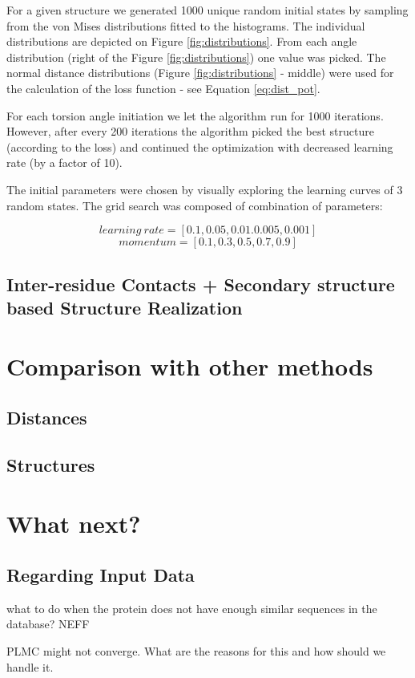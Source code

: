 For a given structure we generated 1000 unique random initial states by sampling from the von Mises distributions fitted to the histograms. The individual distributions are depicted on Figure \ref{fig:distributions}. From each angle distribution (right of the Figure \ref{fig:distributions}) one value was picked. The normal distance distributions (Figure \ref{fig:distributions} - middle) were used for the calculation of the loss function - see Equation \ref{eq:dist_pot}.

For each torsion angle initiation we let the algorithm run for 1000 iterations. However, after every 200 iterations the algorithm picked the best structure (according to the loss) and continued the optimization with decreased learning rate (by a factor of 10).

The initial parameters were chosen by visually exploring the learning curves of 3 random states. The grid search was composed of combination of parameters:

$$learning~rate = [0.1, 0.05, 0.01. 0.005, 0.001]$$
$$momentum = [0.1, 0.3, 0.5, 0.7, 0.9]$$


\subsection{Inter-residue Contacts + Secondary structure based Structure Realization}


\section{Comparison with other methods}
\subsection{Distances}
\subsection{Structures}

\section{What next?}

\subsection{Regarding Input Data}
what to do when the protein does not have enough similar sequences in the database?
NEFF

PLMC might not converge. What are the reasons for this and how should we handle it.

